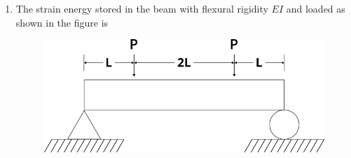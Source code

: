 \documentclass[journal,12pt,onecolumn]{IEEEtran}
\begin{document}
\begin{enumerate}[resume]
    \item The strain energy stored in the beam with flexural rigidity $EI$ and loaded as shown in the figure is
          \begin{figure}[H]
              \centering
              \includegraphics[scale=0.5]{q30}
              \caption{}
              \label{q30}
          \end{figure}

          \begin{enumerate}
          \end{enumerate}


\end{enumerate}
\end{document}
